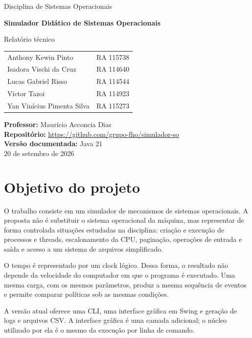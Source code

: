 \documentclass[11pt,a4paper]{article}
\begin{document}
\begin{titlepage}
\thispagestyle{empty}
\centering
\vspace*{1.5cm}
{\Large Disciplina de Sistemas Operacionais\par}
\vspace{1.2cm}
{\Huge\bfseries\color{azul} Simulador Didático de Sistemas Operacionais\par}
\vspace{0.4cm}
{\LARGE Relatório técnico\par}
\vspace{1.4cm}

\begin{tabular}{ll}
Anthony Kewin Pinto & RA 115738\\
Isadora Vischi da Cruz & RA 114640\\
Lucas Gabriel Risso & RA 114544\\
Victor Tazoi & RA 114923\\
Yan Vinícius Pimenta Silva & RA 115273\\
\end{tabular}

\vfill
\textbf{Professor:} Maurício Acconcia Dias\\[0.4cm]
\textbf{Repositório:} \url{https://github.com/grupo-fho/simulador-so}\\[0.4cm]
\textbf{Versão documentada:} Java 21\\[0.4cm]
20 de setembro de 2026
\end{titlepage}

\section{Objetivo do projeto}

O trabalho consiste em um simulador de mecanismos de sistemas operacionais. A proposta não é substituir o sistema operacional da máquina, mas representar de forma controlada situações estudadas na disciplina: criação e execução de processos e threads, escalonamento da CPU, paginação, operações de entrada e saída e acesso a um sistema de arquivos simplificado.

O tempo é representado por um clock lógico. Dessa forma, o resultado não depende da velocidade do computador em que o programa é executado. Uma mesma carga, com os mesmos parâmetros, produz a mesma sequência de eventos e permite comparar políticas sob as mesmas condições.

A versão atual oferece uma CLI, uma interface gráfica em Swing e geração de logs e arquivos CSV. A interface gráfica é uma camada adicional; o núcleo utilizado por ela é o mesmo da execução por linha de comando.
\end{document}

